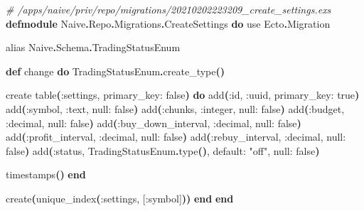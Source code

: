 \documentclass[
  oneside]{book}
\newenvironment{Shaded}{\begin{snugshade}}{\end{snugshade}}
\newcommand{\CommentTok}[1]{\textcolor[rgb]{0.56,0.35,0.01}{\textit{#1}}}
\newcommand{\ConstantTok}[1]{\textcolor[rgb]{0.56,0.35,0.01}{#1}}
\newcommand{\FunctionTok}[1]{\textcolor[rgb]{0.13,0.29,0.53}{\textbf{#1}}}
\newcommand{\ImportTok}[1]{#1}
\newcommand{\KeywordTok}[1]{\textcolor[rgb]{0.13,0.29,0.53}{\textbf{#1}}}
\newcommand{\NormalTok}[1]{#1}
\newcommand{\OperatorTok}[1]{\textcolor[rgb]{0.81,0.36,0.00}{\textbf{#1}}}
\newcommand{\OtherTok}[1]{\textcolor[rgb]{0.56,0.35,0.01}{#1}}
\newcommand{\StringTok}[1]{\textcolor[rgb]{0.31,0.60,0.02}{#1}}
\newcommand{\VariableTok}[1]{\textcolor[rgb]{0.00,0.00,0.00}{#1}}
\begin{document}
\begin{Shaded}
\begin{Highlighting}[]
\CommentTok{\# /apps/naive/priv/repo/migrations/20210202223209\_create\_settings.exs}
\KeywordTok{defmodule} \ConstantTok{Naive}\OperatorTok{.}\ConstantTok{Repo}\OperatorTok{.}\ConstantTok{Migrations}\OperatorTok{.}\ConstantTok{CreateSettings} \KeywordTok{do}
  \ImportTok{use} \ConstantTok{Ecto}\OperatorTok{.}\ConstantTok{Migration}

  \ImportTok{alias} \ConstantTok{Naive}\OperatorTok{.}\ConstantTok{Schema}\OperatorTok{.}\ConstantTok{TradingStatusEnum}

  \KeywordTok{def}\NormalTok{ change }\KeywordTok{do}
    \ConstantTok{TradingStatusEnum}\OperatorTok{.}\NormalTok{create\_type}\FunctionTok{()}

\NormalTok{    create table}\FunctionTok{(}\VariableTok{:settings}\NormalTok{, }\VariableTok{primary\_key:} \ConstantTok{false}\FunctionTok{)} \KeywordTok{do}
\NormalTok{      add}\FunctionTok{(}\VariableTok{:id}\NormalTok{, }\VariableTok{:uuid}\NormalTok{, }\VariableTok{primary\_key:} \ConstantTok{true}\FunctionTok{)}
\NormalTok{      add}\FunctionTok{(}\VariableTok{:symbol}\NormalTok{, }\VariableTok{:text}\NormalTok{, }\VariableTok{null:} \ConstantTok{false}\FunctionTok{)}
\NormalTok{      add}\FunctionTok{(}\VariableTok{:chunks}\NormalTok{, }\VariableTok{:integer}\NormalTok{, }\VariableTok{null:} \ConstantTok{false}\FunctionTok{)}
\NormalTok{      add}\FunctionTok{(}\VariableTok{:budget}\NormalTok{, }\VariableTok{:decimal}\NormalTok{, }\VariableTok{null:} \ConstantTok{false}\FunctionTok{)}
\NormalTok{      add}\FunctionTok{(}\VariableTok{:buy\_down\_interval}\NormalTok{, }\VariableTok{:decimal}\NormalTok{, }\VariableTok{null:} \ConstantTok{false}\FunctionTok{)}
\NormalTok{      add}\FunctionTok{(}\VariableTok{:profit\_interval}\NormalTok{, }\VariableTok{:decimal}\NormalTok{, }\VariableTok{null:} \ConstantTok{false}\FunctionTok{)}
\NormalTok{      add}\FunctionTok{(}\VariableTok{:rebuy\_interval}\NormalTok{, }\VariableTok{:decimal}\NormalTok{, }\VariableTok{null:} \ConstantTok{false}\FunctionTok{)}
\NormalTok{      add}\FunctionTok{(}\VariableTok{:status}\NormalTok{, }\ConstantTok{TradingStatusEnum}\OperatorTok{.}\NormalTok{type}\FunctionTok{()}\NormalTok{, }\VariableTok{default:} \StringTok{"off"}\NormalTok{, }\VariableTok{null:} \ConstantTok{false}\FunctionTok{)}

\NormalTok{      timestamps}\FunctionTok{()}
    \KeywordTok{end}

\NormalTok{    create}\FunctionTok{(}\NormalTok{unique\_index}\FunctionTok{(}\VariableTok{:settings}\NormalTok{, }\OtherTok{[}\VariableTok{:symbol}\OtherTok{]}\FunctionTok{))}
  \KeywordTok{end}
\KeywordTok{end}
\end{Highlighting}
\end{Shaded}
\end{document}
